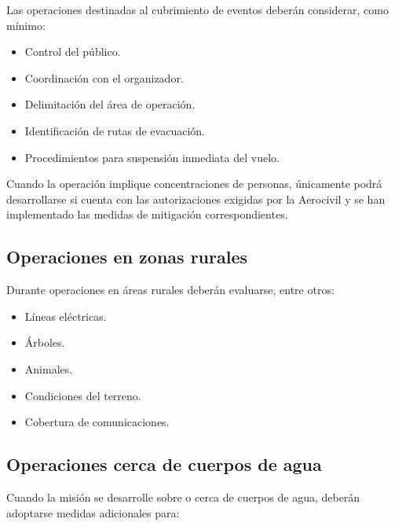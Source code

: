 Las operaciones destinadas al cubrimiento de eventos deberán considerar, como mínimo:

\begin{itemize}

\item Control del público.

\item Coordinación con el organizador.

\item Delimitación del área de operación.

\item Identificación de rutas de evacuación.

\item Procedimientos para suspensión inmediata del vuelo.

\end{itemize}

Cuando la operación implique concentraciones de personas, únicamente podrá desarrollarse si cuenta con las autorizaciones exigidas por la Aerocivil y se han implementado las medidas de mitigación correspondientes.



\subsection{Operaciones en zonas rurales}

Durante operaciones en áreas rurales deberán evaluarse, entre otros:

\begin{itemize}

\item Líneas eléctricas.

\item Árboles.

\item Animales.

\item Condiciones del terreno.

\item Cobertura de comunicaciones.

\end{itemize}


\subsection{Operaciones cerca de cuerpos de agua}

Cuando la misión se desarrolle sobre o cerca de cuerpos de agua, deberán adoptarse medidas adicionales para:

